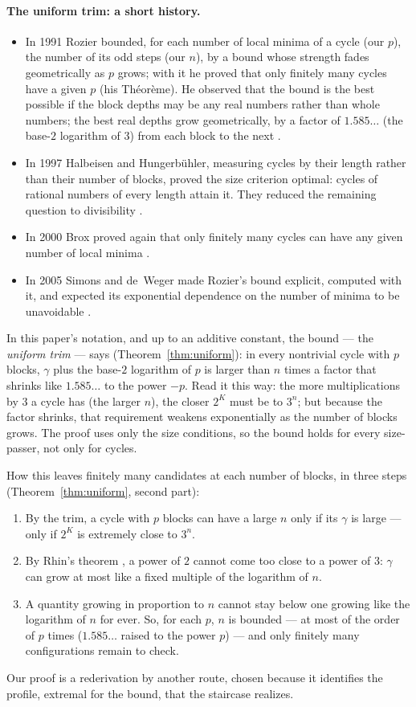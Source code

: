 \documentclass[11pt]{article}
\theoremstyle{remark}
\begin{document}
\paragraph{The uniform trim: a short history.}
\begin{itemize}
\item In 1991 Rozier bounded, for each number of local minima of a cycle (our $p$), the number of its odd steps (our $n$), by a bound whose strength fades geometrically as $p$ grows; with it he proved that only finitely many cycles have a given $p$ (his Th\'eor\`eme). He observed that the bound is the best possible if the block depths may be any real numbers rather than whole numbers; the best real depths grow geometrically, by a factor of $1.585\ldots$ (the base-$2$ logarithm of $3$) from each block to the next \cite{rozier91}.
\item In 1997 Halbeisen and Hungerb\"uhler, measuring cycles by their length rather than their number of blocks, proved the size criterion optimal: cycles of rational numbers of every length attain it. They reduced the remaining question to divisibility \cite{hh}.
\item In 2000 Brox proved again that only finitely many cycles can have any given number of local minima \cite{brox}.
\item In 2005 Simons and de~Weger made Rozier's bound explicit, computed with it, and expected its exponential dependence on the number of minima to be unavoidable \cite{sdw}.
\end{itemize}
In this paper's notation, and up to an additive constant, the bound --- the \emph{uniform trim} --- says (Theorem~\ref{thm:uniform}): in every nontrivial cycle with $p$ blocks, $\gamma$ plus the base-$2$ logarithm of $p$ is larger than $n$ times a factor that shrinks like $1.585\ldots$ to the power $-p$. Read it this way: the more multiplications by $3$ a cycle has (the larger $n$), the closer $2^K$ must be to $3^n$; but because the factor shrinks, that requirement weakens exponentially as the number of blocks grows. The proof uses only the size conditions, so the bound holds for every size-passer, not only for cycles.

How this leaves finitely many candidates at each number of blocks, in three steps (Theorem~\ref{thm:uniform}, second part):
\begin{enumerate}
\item[(a)] By the trim, a cycle with $p$ blocks can have a large $n$ only if its $\gamma$ is large --- only if $2^K$ is extremely close to $3^n$.
\item[(b)] By Rhin's theorem \cite{rhin}, a power of $2$ cannot come too close to a power of $3$: $\gamma$ can grow at most like a fixed multiple of the logarithm of $n$.
\item[(c)] A quantity growing in proportion to $n$ cannot stay below one growing like the logarithm of $n$ for ever. So, for each $p$, $n$ is bounded --- at most of the order of $p$ times ($1.585\ldots$ raised to the power $p$) --- and only finitely many configurations remain to check.
\end{enumerate}
Our proof is a rederivation by another route, chosen because it identifies the profile, extremal for the bound, that the staircase realizes.
\end{document}
